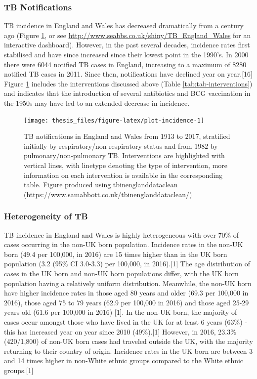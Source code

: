 \documentclass[11pt,twoside]{bristolthesis}
\begin{document}
  \hypertarget{tb-notifications}{%
  \subsubsection{TB Notifications}\label{tb-notifications}}
  
  TB incidence in England and Wales has decreased dramatically from a century ago (Figure \ref{fig:plot-incidence}, or see \url{http://www.seabbs.co.uk/shiny/TB_England_Wales} for an interactive dashboard). However, in the past several decades, incidence rates first stabilised and have since increased since their lowest point in the 1990's. In 2000 there were 6044 notified TB cases in England, increasing to a maximum of 8280 notified TB cases in 2011. Since then, notifications have declined year on year.{[}16{]} Figure \ref{fig:plot-incidence} includes the interventions discussed above (Table \ref{tab:tab-interventions}) and indicates that the introduction of several antibiotics and BCG vaccination in the 1950s may have led to an extended decrease in incidence.
  \begin{figure}
  
  {\centering \texttt{[image: thesis\_files/figure-latex/plot-incidence-1]} 
  
  }
  
  \caption{TB notifications in England and Wales from 1913 to 2017, stratified initially by respiratory/non-respiratory status and from 1982 by pulmonary/non-pulmonary TB. Interventions are highlighted with vertical lines, with linetype denoting the type of intervention, more information on each intervention is available in the corresponding table. Figure produced using tbinenglanddataclean (https://www.samabbott.co.uk/tbinenglanddataclean/)}\label{fig:plot-incidence}
  \end{figure}
  \hypertarget{heterogeneity-of-tb}{%
  \subsubsection{Heterogeneity of TB}\label{heterogeneity-of-tb}}
  
  TB incidence in England and Wales is highly heterogeneous with over 70\% of cases occurring in the non-UK born population. Incidence rates in the non-UK born (49.4 per 100,000, in 2016) are 15 times higher than in the UK born population (3.2 (95\% CI 3.0-3.3) per
  100,000, in 2016).{[}1{]} The age distribution of cases in the UK born and non-UK born populations differ, with the UK born population having a relatively uniform distribution. Meanwhile, the non-UK born have higher incidence rates in those aged 80 years and older (69.3 per 100,000 in 2016), those aged 75 to 79 years (62.9 per 100,000 in 2016) and those aged 25-29 years old (61.6 per 100,000 in 2016) {[}1{]}. In the non-UK born, the majority of cases occur amongst those who have lived in the UK for at least 6 years (63\%) - this has increased year on year since 2010 (49\%).{[}1{]} However, in 2016, 23.3\% (420/1,800) of non-UK born cases had traveled outside the UK, with the majority returning to their country of origin. Incidence rates in the UK born are between 3 and 14 times higher in non-White ethnic groups compared to the White ethnic groups.{[}1{]}
  
\end{document}
